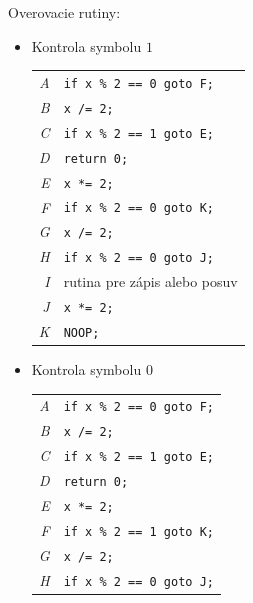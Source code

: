 \documentclass[11pt,a4paper]{article}
\begin{document}
Overovacie rutiny:
\begin{itemize}
    \item Kontrola symbolu $1$
        \begin{flushright}
        \begin{minipage}{0.90\textwidth}
            \begin{tabular}{r|l}
                \textit{A} & \texttt{if x \% 2 == 0 goto F;}\\
                \textit{B} & \texttt{x /= 2;}\\
                \textit{C} & \texttt{if x \% 2 == 1 goto E;}\\
                \textit{D} & \texttt{return 0;}\\
                \textit{E} & \texttt{x *= 2;}\\
                \textit{F} & \texttt{if x \% 2 == 0 goto K;}\\
                \textit{G} & \texttt{x /= 2;}\\
                \textit{H} & \texttt{if x \% 2 == 0 goto J;}\\
                \textit{I} & rutina pre zápis alebo posuv\\
                \textit{J} & \texttt{x *= 2;}\\
                \textit{K} & \texttt{NOOP;}
            \end{tabular}
        \end{minipage}
        \end{flushright}
    \item Kontrola symbolu $0$
        \begin{flushright}
        \begin{minipage}{0.90\textwidth}
            \begin{tabular}{r|l}
                \textit{A} & \texttt{if x \% 2 == 0 goto F;}\\
                \textit{B} & \texttt{x /= 2;}\\
                \textit{C} & \texttt{if x \% 2 == 1 goto E;}\\
                \textit{D} & \texttt{return 0;}\\
                \textit{E} & \texttt{x *= 2;}\\
                \textit{F} & \texttt{if x \% 2 == 1 goto K;}\\
                \textit{G} & \texttt{x /= 2;}\\
                \textit{H} & \texttt{if x \% 2 == 0 goto J;}\\

\end{tabular}
\end{minipage}
\end{flushright}
\end{itemize}
\end{document}

